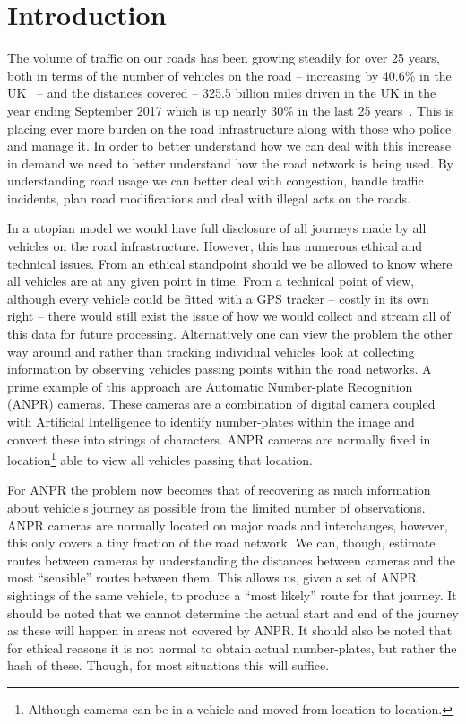 \section{Introduction}

The volume of traffic on our roads has been growing steadily for over 25 years, both in terms of the number of vehicles on the road -- increasing by 40.6\% in the UK~\cite{noVehiocles} -- and the distances covered -- 325.5 billion miles driven in the UK in the year ending September 2017 which is up nearly 30\% in the last 25 years~\cite{distance}. This is placing ever more burden on the road infrastructure along with those who police and manage it. In order to better understand how we can deal with this increase in demand we need to better understand how the road network is being used. By understanding road usage we can better deal with congestion, handle traffic incidents, plan road modifications and deal with illegal acts on the roads.

In a utopian model we would have full disclosure of all journeys made by all vehicles on the road infrastructure. However, this has numerous ethical and technical issues. From an ethical standpoint should we be allowed to know where all vehicles are at any given point in time. From a technical point of view, although every vehicle could be fitted with a GPS tracker -- costly in its own right -- there would still exist the issue of how we would collect and stream all of this data for future processing. Alternatively one can view the problem the other way around and rather than tracking individual vehicles look at collecting information by observing vehicles passing points within the road networks. A prime example of this approach are Automatic Number-plate Recognition (ANPR) cameras. These cameras are a combination of digital camera coupled with Artificial Intelligence to identify number-plates within the image and convert these into strings of characters. ANPR cameras are normally fixed in location\footnote{Although cameras can be in a vehicle and moved from location to location.} able to view all vehicles passing that location.

For ANPR the problem now becomes that of recovering as much information about vehicle's journey as possible from the limited number of observations. ANPR cameras are normally located on major roads and interchanges, however, this only covers a tiny fraction of the road network. We can, though, estimate routes between cameras by understanding the distances between cameras and the most ``sensible'' routes between them. This allows us, given a set of ANPR sightings of the same vehicle, to produce a ``most likely'' route for that journey. It should be noted that we cannot determine the actual start and end of the journey as these will happen in areas not covered by ANPR. It should also be noted that for ethical reasons it is not normal to obtain actual number-plates, but rather the hash of these. Though, for most situations this will suffice.

